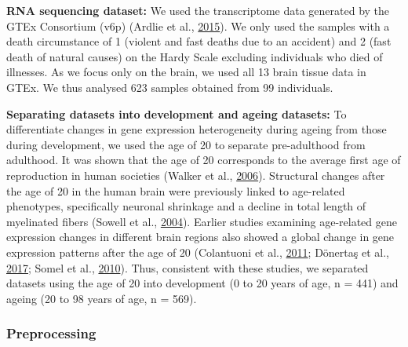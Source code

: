 \documentclass[12pt,twoside]{unicam}
\begin{document}
\textbf{RNA sequencing dataset:} We used the transcriptome data generated by the GTEx Consortium (v6p) (Ardlie et al., \protect\hyperlink{ref-Ardlie2015}{2015}). We only used the samples with a death circumstance of 1 (violent and fast deaths due to an accident) and 2 (fast death of natural causes) on the Hardy Scale excluding individuals who died of illnesses. As we focus only on the brain, we used all 13 brain tissue data in GTEx. We thus analysed 623 samples obtained from 99 individuals.

\textbf{Separating datasets into development and ageing datasets:} To differentiate changes in gene expression heterogeneity during ageing from those during development, we used the age of 20 to separate pre-adulthood from adulthood. It was shown that the age of 20 corresponds to the average first age of reproduction in human societies (Walker et al., \protect\hyperlink{ref-Walker2006}{2006}). Structural changes after the age of 20 in the human brain were previously linked to age-related phenotypes, specifically neuronal shrinkage and a decline in total length of myelinated fibers (Sowell et al., \protect\hyperlink{ref-Sowell2004}{2004}). Earlier studies examining age-related gene expression changes in different brain regions also showed a global change in gene expression patterns after the age of 20 (Colantuoni et al., \protect\hyperlink{ref-Colantuoni2011}{2011}; Dönertaş et al., \protect\hyperlink{ref-Donertas2017}{2017}; Somel et al., \protect\hyperlink{ref-Somel2010}{2010}). Thus, consistent with these studies, we separated datasets using the age of 20 into development (0 to 20 years of age, n = 441) and ageing (20 to 98 years of age, n = 569).

\hypertarget{preprocessing}{%
\subsubsection{Preprocessing}\label{preprocessing}}
\end{document}
